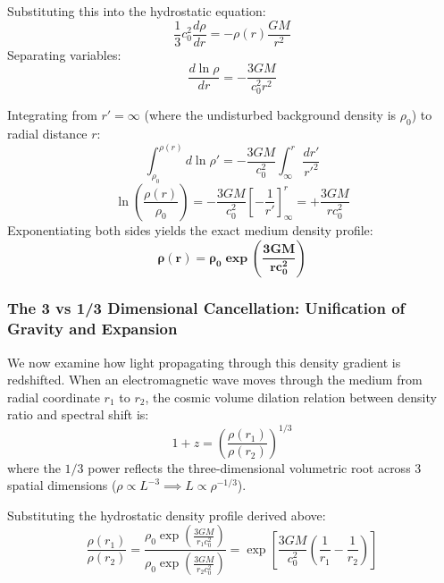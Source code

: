 \documentclass[11pt,a4paper]{article}
\begin{document}
Substituting this into the hydrostatic equation:
\begin{equation}
\frac{1}{3} c_0^2 \frac{d\rho}{dr} = -\rho(r) \frac{GM}{r^2}
\end{equation}
Separating variables:
\begin{equation}
\frac{d\ln\rho}{dr} = -\frac{3GM}{c_0^2 r^2}
\end{equation}

Integrating from $r' = \infty$ (where the undisturbed background density is $\rho_0$) to radial distance $r$:
\begin{equation}
\int_{\rho_0}^{\rho(r)} d\ln\rho' = -\frac{3GM}{c_0^2} \int_\infty^r \frac{dr'}{r'^2}
\end{equation}
\begin{equation}
\ln\left( \frac{\rho(r)}{\rho_0} \right) = -\frac{3GM}{c_0^2} \left[ -\frac{1}{r'} \right]_\infty^r = +\frac{3GM}{r c_0^2}
\end{equation}
Exponentiating both sides yields the exact medium density profile:
\begin{equation}
\mathbf{\rho(r) = \rho_0 \exp\left( \frac{3GM}{r c_0^2} \right)}
\label{eq:exponential_density_profile}
\end{equation}

\subsubsection{The 3 vs 1/3 Dimensional Cancellation: Unification of Gravity and Expansion}

We now examine how light propagating through this density gradient is redshifted. When an electromagnetic wave moves through the medium from radial coordinate $r_1$ to $r_2$, the cosmic volume dilation relation between density ratio and spectral shift is:
\begin{equation}
1 + z = \left( \frac{\rho(r_1)}{\rho(r_2)} \right)^{1/3}
\label{eq:cosmic_density_redshift}
\end{equation}
where the $1/3$ power reflects the three-dimensional volumetric root across 3 spatial dimensions ($\rho \propto L^{-3} \implies L \propto \rho^{-1/3}$).

Substituting the hydrostatic density profile derived above:
\begin{equation}
\frac{\rho(r_1)}{\rho(r_2)} = \frac{\rho_0 \exp\left( \frac{3GM}{r_1 c_0^2} \right)}{\rho_0 \exp\left( \frac{3GM}{r_2 c_0^2} \right)} = \exp\left[ \frac{3GM}{c_0^2} \left( \frac{1}{r_1} - \frac{1}{r_2} \right) \right]
\end{equation}
\end{document}
